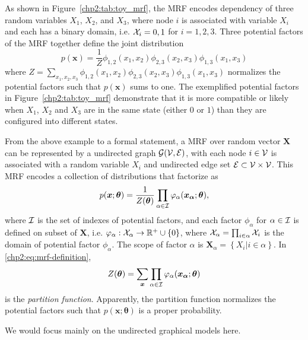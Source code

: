 \begin{example}
  As shown in Figure~\ref{chp2:tab:toy_mrf}, the MRF encodes dependency of three random variables $X_1$, $X_2$, and $X_3$, where node $i$ is associated with variable $X_i$ and each has a binary domain, i.e. $\mathcal{X}_i = {0,1}$ for $i =1,2,3$. Three potential factors of the MRF together define the joint distribution
  \begin{equation*}
    p(\bm{x}) = \frac{1}{Z} \phi_{1,2}(x_1, x_2) \phi_{2,3}(x_2, x_3) \phi_{1,3}(x_1, x_3)
  \end{equation*}
  where $Z = \sum_{x_1, x_2, x_3}\phi_{1,2}(x_1, x_2) \phi_{2,3}(x_2, x_3) \phi_{1,3}(x_1, x_3)$ normalizes the potential factors such that $p(\bm{x})$ sums to one. The exemplified potential factors in Figure~\ref{chp2:tab:toy_mrf} demonstrate that it is more compatible or likely when $X_1$, $X_2$ and $X_3$ are in the same state (either $0$ or $1$) than they are configured into different states.
\end{example}

From the above example to a formal statement, a MRF over random vector $\bm{X}$ can be represented by a undirected graph $\mathcal{G}(\mathcal{V}, \mathcal{E})$, with each node $i \in \mathcal{V}$ is associated with a random variable $X_i$ and undirected edge set $\mathcal{E} \subset \mathcal{V} \times \mathcal{V}$. This MRF encodes a collection of distributions that factorize as
\begin{equation}\label{chp2:eq:mrf-definition}
  p(\bm{x};\bm{\theta}) = \frac{1}{Z(\bm{\theta})} \prod_{\alpha \in \mathcal{I}} \varphi_{\alpha}(\bm{x_{\alpha}};\bm{\theta}),
\end{equation}
where $\mathcal{I}$ is the set of indexes of potential factors, and each factor $\phi_{\alpha}$ for $\alpha\in \mathcal{I}$ is defined on subset of $\bm{X}$, i.e. $\varphi_{\alpha}: \mathcal{X}_{\alpha} \rightarrow \mathbb{R}^{+} \cup \{0\}$, where $\mathcal{X}_{\alpha} = \prod_{i\in \alpha}\mathcal{X}_i$ is the domain of potential factor $\phi_{\alpha}$. The scope of factor $\alpha$ is $\bm{X}_{\alpha} = \left\{ X_i| i\in \alpha \right\}$. In \eqref{chp2:eq:mrf-definition},
\begin{equation}
  Z(\bm{\theta}) = \sum_{\bm{x}} \prod_{\alpha \in \mathcal{I}} \varphi_{\alpha}(\bm{x_{\alpha}};\bm{\theta})
\end{equation}
is the \textit{partition function}. Apparently, the partition function normalizes the potential factors such that $p(\bm{x}; \bm{\theta})$ is a proper probability.

 
We would focus mainly on the undirected graphical models here.


